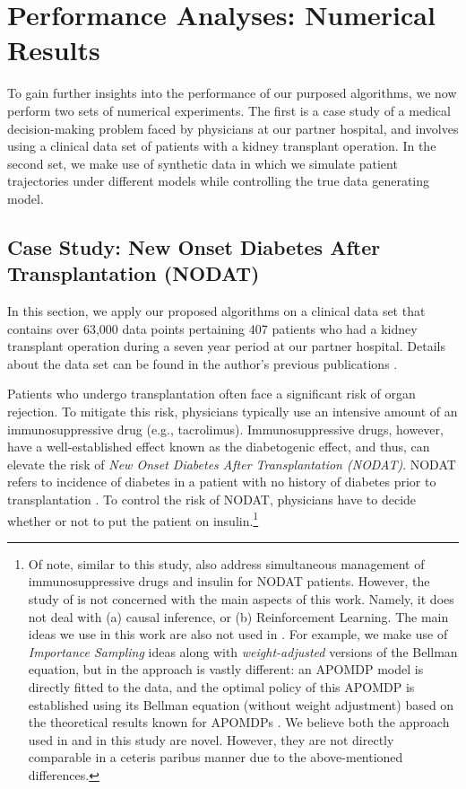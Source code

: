 \documentclass[opre,nonblindrev]{informs2}%
\newcommand{\1}{\hbox{\rm 1\kern-.35em 1}}
\begin{document}
\section{Performance Analyses: Numerical Results}\label{sec:numerical}
To gain further insights into the performance of our purposed algorithms, we now perform two sets of numerical experiments. The first is a case study of a  medical decision-making problem faced by physicians at our partner hospital, and  involves using a clinical data set of
patients with a kidney transplant operation. In  the second set, we make use of synthetic data in which we simulate  patient trajectories under different models while controlling the true data generating model.



\subsection{Case Study: New Onset Diabetes After Transplantation (NODAT)}\label{sec:case}
In this section, we apply our proposed algorithms on a clinical data set that contains over  63,000 data points pertaining  407
patients who had a kidney transplant operation during a seven year period at our partner hospital.  Details about the data set can be found in the author's previous publications \citep{Boloori2015, Boloori2020, Munshi2020, Munshi2021}.

Patients who undergo transplantation often face a significant risk of organ rejection. To mitigate this risk, physicians typically use an intensive amount of an immunosuppressive drug (e.g., tacrolimus). Immunosuppressive drugs, however, have a well-established effect known as the diabetogenic effect,  and thus, can elevate the risk of {\em New Onset Diabetes After Transplantation (NODAT)}. NODAT refers to incidence of diabetes in a
patient with no history of diabetes prior to transplantation \citep[see, e.g., ][ and the references therein]{Chakkera2009, Boloori2015, Boloori2020}. To control the risk of NODAT, physicians have to decide whether or not to put the patient on insulin.\footnote{Of note,   similar to this study, \cite{Boloori2020} also address simultaneous management of immunosuppressive drugs and insulin for NODAT patients. However, the study of \cite{Boloori2020} is not concerned with the main aspects of this work. Namely, it does not deal with  (a) causal inference, or (b) Reinforcement Learning. The main ideas we use in this work are also not used in \cite{Boloori2020}. For example, we make use of {\em Importance Sampling} ideas along with  {\em weight-adjusted} versions of the Bellman equation,  but  in \cite{Boloori2020} the approach is vastly different: an APOMDP model is directly fitted to the data, and the optimal policy of this APOMDP is established using its Bellman equation (without weight adjustment) based on the theoretical results known for APOMDPs \citep{Saghafian2018}. We believe both the approach used in \cite{Boloori2020} and in this study are novel. However, they are not directly comparable in a ceteris paribus manner due to the above-mentioned differences.}
\end{document}
